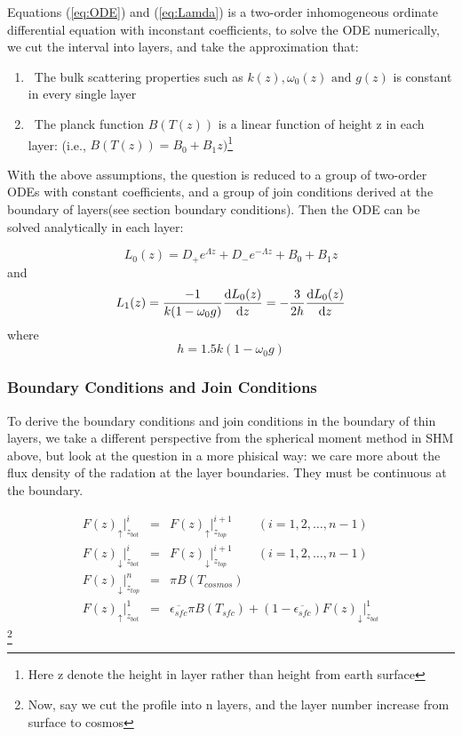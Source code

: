 Equations (\ref{eq:ODE}) and (\ref{eq:Lamda}) is a 
two-order inhomogeneous ordinate differential equation 
with inconstant coefficients, to solve the ODE numerically, 
we cut the interval into layers, and take the approximation that:
\begin{enumerate}
\item The bulk scattering properties such as $k(z), \omega_{0}(z) \textrm{ and } g(z)$
is constant in every single layer
\item The planck function $B(T(z))$ is a linear function of height z in each layer:
(i.e., $B(T(z)) = B_{0} + B_{1}z) $\footnote{Here z denote the height in layer rather than height from earth surface}
\end{enumerate}
With the above assumptions, the question is reduced to a group of 
two-order ODEs with constant coefficients, and a group of join conditions
derived at the boundary of layers(see section boundary conditions).
Then the ODE can be solved analytically in each layer:

\begin{equation} \label{eq:analsolul0}
    L_{0}(z) = D_{+}e^{\Lambda z} + D_{-}e^{ - \Lambda z} + B_{0} + B_{1}z
\end{equation}
and
\begin{equation} \label{eq:analsolul1}
    L_{1}(z) = \frac{-1}{k(1-\omega_{0}g)}\frac{\mathrm{d} L_{0}(z)}{\mathrm{d} z} 
    = -\frac{3}{2h} \frac{\mathrm{d} L_{0}(z)}{\mathrm{d} z}
\end{equation}
where
\begin{equation} \label{eq:h}
    h = 1.5k(1-\omega_{0}g)
\end{equation}

\subsubsection{Boundary Conditions and Join Conditions}
To derive the boundary conditions and join conditions in the boundary of 
thin layers, we take a different perspective from the spherical moment method in SHM above,
but look at the question in a more phisical way: we care more about the flux density of the radation 
at the layer boundaries. They must be continuous at the boundary.


\begin{eqnarray} \label{eq:fluxdensity} 
    F(z)_{\uparrow}\Big|_{z_{bot}}^{i} & = & F(z)_{\uparrow}\Big|_{z_{top}}^{i+1} \qquad (i=1,2,\ldots,n-1) \nonumber\\
    F(z)_{\downarrow}\Big|_{z_{bot}}^{i} & = & F(z)_{\downarrow}\Big|_{z_{top}}^{i+1} \qquad (i=1,2,\ldots,n-1) \nonumber\\
    F(z)_{\downarrow}\Big|_{z_{top}}^{n} & = & \pi B(T_{cosmos}) \nonumber\\
    F(z)_{\uparrow}\Big|_{z_{bot}}^{1} & = & \overline{\epsilon_{sfc}} \pi B(T_{sfc}) 
    + (1-\overline{\epsilon_{sfc}}) F(z)_{\downarrow}\Big|_{z_{bot}}^{1}  
\end{eqnarray} \footnote{Now, say we cut the profile into n layers, and the layer number increase from surface to cosmos}

